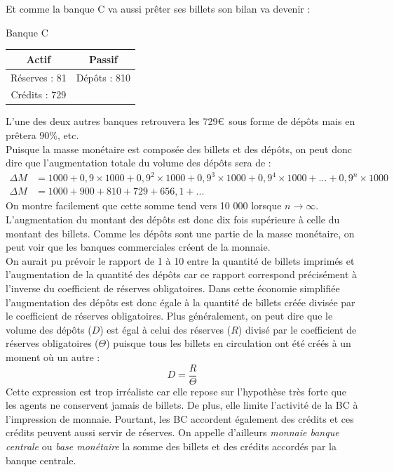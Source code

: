 \documentclass[10pt]{book}
\begin{document}
Et comme la banque C va aussi prêter ses billets son bilan va devenir :
\begin{center}
  Banque C \\
  \begin{tabular}{c|c}
    Actif & Passif \\
    \hline
    Réserves : 81 & Dépôts : 810 \\
    Crédits : 729 & 
  \end{tabular}
\end{center}
L'une des deux autres banques retrouvera les 729\euro~sous forme de dépôts mais en prêtera $90\%$, etc. \\
Puisque la masse monétaire est composée des billets et des dépôts, on peut donc dire que l'augmentation totale du volume des dépôts sera de :
\begin{align*}
  \Delta M & = 1000 + 0,9 \times 1000 + 0,9^2 \times 1000 + 0,9^3 \times 1000 + 0,9^4 \times 1000 + ... + 0,9^n \times 1000 \\
  \Delta M & = 1000 + 900 + 810 + 729 + 656,1 + ...
\end{align*}
On montre facilement que cette somme tend vers 10 000 lorsque $n \rightarrow \infty$. L'augmentation du montant des dépôts est donc dix fois supérieure à celle du montant des billets. Comme les dépôts sont une partie de la masse monétaire, on peut voir que les banques commerciales créent de la monnaie. \\
On aurait pu prévoir le rapport de 1 à 10 entre la quantité de billets imprimés et l'augmentation de la quantité des dépôts car ce rapport correspond précisément à l'inverse du coefficient de réserves obligatoires. Dans cette économie simplifiée l'augmentation des dépôts est donc égale à la quantité de billets créée divisée par le coefficient de réserves obligatoires. Plus généralement, on peut dire que le volume des dépôts ($D$) est égal à celui des réserves ($R$) divisé par le coefficient de réserves obligatoires ($\Theta$) puisque tous les billets en circulation ont été créés à un moment où un autre :
$$ D = \frac{R}{\Theta}$$
Cette expression est trop irréaliste car elle repose sur l'hypothèse très forte que les agents ne conservent jamais de billets. De plus, elle limite l'activité de la BC à l'impression de monnaie. Pourtant, les BC accordent également des crédits et ces crédits peuvent aussi servir de réserves. On appelle d'ailleurs \textit{monnaie banque centrale} ou \textit{base monétaire} la somme des billets et des crédits accordés par la banque centrale. \\
\end{document}

